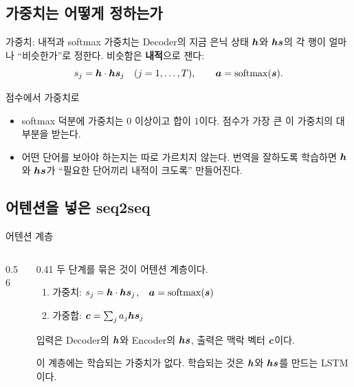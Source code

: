 \documentclass[aspectratio=169,11pt]{beamer}
\begin{document}
\subsection{가중치는 어떻게 정하는가}

\begin{frame}{가중치: 내적과 softmax}
가중치는 Decoder의 지금 은닉 상태 $\bm{h}$와 $\bm{hs}$의 각 행이
얼마나 ``비슷한가''로 정한다. 비슷함은 \textbf{내적}으로 잰다:
\[
s_j=\bm{h}\cdot\bm{hs}_j\quad(j=1,\dots,T),\qquad \bm{a}=\operatorname{softmax}(\bm{s}).
\]
\end{frame}

\begin{frame}{점수에서 가중치로}
\vskip1mm
\begin{itemize}
\item softmax 덕분에 가중치는 $0$ 이상이고 합이 $1$이다.
  점수가 가장 큰 이 가중치의 대부분을 받는다.
\item 어떤 단어를 보아야 하는지는 따로 가르치지 않는다.
  번역을 잘하도록 학습하면 $\bm{h}$와 $\bm{hs}$가
  ``필요한 단어끼리 내적이 크도록'' 만들어진다.
\end{itemize}
\end{frame}

\subsection{어텐션을 넣은 seq2seq}

\begin{frame}{어텐션 계층}
\begin{columns}[c,onlytextwidth]
\begin{column}{0.56\textwidth}
\end{column}
\begin{column}{0.41\textwidth}
두 단계를 묶은 것이 어텐션 계층이다.
\begin{enumerate}
\item 가중치: $s_j=\bm{h}\cdot\bm{hs}_j$,\ \ $\bm{a}=\operatorname{softmax}(\bm{s})$
\item 가중합: $\bm{c}=\sum_j a_j\bm{hs}_j$
\end{enumerate}
\vskip2mm
입력은 Decoder의 $\bm{h}$와 Encoder의 $\bm{hs}$, 출력은 맥락 벡터 $\bm{c}$이다.
\vskip2mm
\begin{remarkbox}
이 계층에는 학습되는 가중치가 없다.
학습되는 것은 $\bm{h}$와 $\bm{hs}$를 만드는 LSTM이다.
\end{remarkbox}
\end{column}
\end{columns}
\end{frame}
\end{document}
